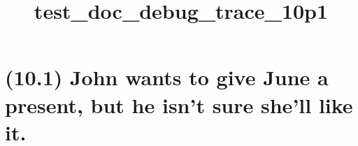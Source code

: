 \documentclass{article}
\begin{document}
%
%

\title{\textbf{test\_doc\_debug\_trace\_10p1}}
\maketitle

\clearpage

%
%

\section*{(10.1) John wants to give June a present, but he isn't sure she’ll like it.}
\end{document}
